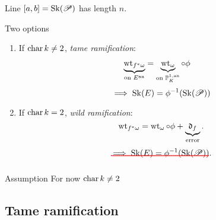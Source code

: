 \begin{frame}
\begin{figure}[ht]
    \centering
\end{figure}
Line $[a, b] = \operatorname{Sk}(\mathscr P)$ has length  $n$. 
\end{frame}
\begin{frame}{Two options}
	\begin{minipage}[t]{.48\textwidth}
		\begin{enumerate}
		\item If $\operatorname{char} k \ne 2$, \emph{tame ramification}: \begin{align*}
				\underbrace{\operatorname{wt}_{f^*\omega}}_{\text{on }E{}^{\text{an}}} &= \underbrace{\operatorname{wt}_{\omega}}_{\text{on }\mathbb P^{1, \text{an}}_K} \mathbin{\circ} \phi
			\end{align*}
			\pause
			\[
				\implies \operatorname{Sk}(E) = \phi^{-1}(\operatorname{Sk}(\mathscr P))
			\]
	\end{enumerate}
	\pause

	\end{minipage}
	\;
	\begin{minipage}[t]{.48\textwidth}
	\begin{enumerate}
		\setcounter{enumi}{1}
		\item If $\operatorname{char} k = 2$, \emph{wild ramification}:
			\[
				\operatorname{wt}_{f^* \omega} = \operatorname{wt}_{\omega} \circ \phi + \underbrace{\mathfrak{d} _f}_{\text{error}}
			.\] 
			\pause
			\[
				\redout{\text{$\implies \sk(E) = \phi^{-1}(\sk(\sP))$}}
			.\] 
	\end{enumerate}
	\end{minipage}
	\pause
	\medskip
	\begin{block}{Assumption}
		For now $\operatorname{char} k \ne 2$
	\end{block}

\end{frame}

\subsection{Tame ramification} \label{sec:tame_ramification}

